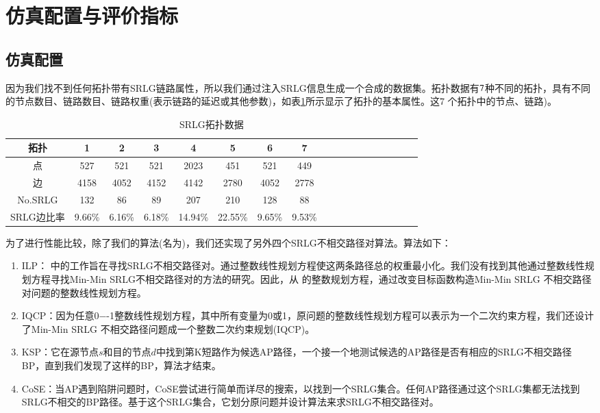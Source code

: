 \section{仿真配置与评价指标}
\subsection{仿真配置}

因为我们找不到任何拓扑带有SRLG链路属性，所以我们通过注入SRLG信息生成一个合成的数据集。拓扑数据有$7$种不同的拓扑，具有不同的节点数目、链路数目、链路权重(表示链路的延迟或其他参数)，如表\ref{tab:AllSample}所示显示了拓扑的基本属性。这7 个拓扑中的节点、链路)。

\begin{table}[htbp]
\caption{SRLG拓扑数据}
  \centering
\footnotesize{  \begin{tabular}{*{18}{c}}
\toprule
拓扑 & 1 & 2 & 3 & 4 & 5 & 6& 7   \\
\midrule
点   &     527&      521    &      521     &    2023             &     451     &     521     &     449       \\
边   &    4158 &  4052     &    4152      &   4142          &       2780   &      4052   &      2778    \\
No.SRLG & 132 &  86   &  89  &  207        & 210  &  128  &   88    \\
SRLG边比率 & 9.66\% & 6.16\% &   6.18\% &   14.94\%    &   22.55\%  &  9.65\% &   9.53\%     \\
\bottomrule
\end{tabular}
}
\label{tab:AllSample}
\end{table}

为了进行性能比较，除了我们的算法(名为\CI)，我们还实现了另外四个SRLG不相交路径对算法。算法如下：
\begin{enumerate}
  \item ILP\cite{hu2003diverse}： 中的工作旨在寻找SRLG不相交路径对。通过整数线性规划方程使这两条路径总的权重最小化。我们没有找到其他通过整数线性规划方程寻找Min-Min SRLG不相交路径对的方法的研究。因此，从\cite{hu2003diverse} 的整数规划方程，通过改变目标函数构造Min-Min SRLG 不相交路径对问题的整数线性规划方程。
  \item IQCP\cite{hu2003diverse}：因为任意0−-1整数线性规划方程，其中所有变量为0或1，原问题的整数线性规划方程可以表示为一个二次约束方程，我们还设计了Min-Min SRLG 不相交路径问题成一个整数二次约束规划(IQCP)\cite{hu2003diverse}。
  \item KSP\cite{eppstein1998finding}：它在源节点$s$和目的节点$d$中找到第K短路作为候选AP路径，一个接一个地测试候选的AP路径是否有相应的SRLG不相交路径BP，直到我们发现了这样的BP，算法才结束。
  \item CoSE\cite{rostami2007cose}：当AP遇到陷阱问题时，CoSE尝试进行简单而详尽的搜索，以找到一个SRLG集合。任何AP路径通过这个SRLG集都无法找到SRLG不相交的BP路径。基于这个SRLG集合，它划分原问题并设计算法来求SRLG不相交路径对。
\end{enumerate}

